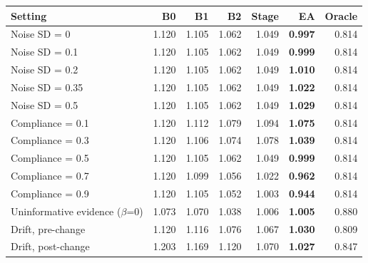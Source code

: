 \begin{tabular}{lrrrrrr}
\toprule
Setting & B0 & B1 & B2 & Stage & \textbf{EA} & Oracle \\
\midrule
Noise SD = 0 & 1.120 & 1.105 & 1.062 & 1.049 & \textbf{0.997} & 0.814 \\
Noise SD = 0.1 & 1.120 & 1.105 & 1.062 & 1.049 & \textbf{0.999} & 0.814 \\
Noise SD = 0.2 & 1.120 & 1.105 & 1.062 & 1.049 & \textbf{1.010} & 0.814 \\
Noise SD = 0.35 & 1.120 & 1.105 & 1.062 & 1.049 & \textbf{1.022} & 0.814 \\
Noise SD = 0.5 & 1.120 & 1.105 & 1.062 & 1.049 & \textbf{1.029} & 0.814 \\
Compliance = 0.1 & 1.120 & 1.112 & 1.079 & 1.094 & \textbf{1.075} & 0.814 \\
Compliance = 0.3 & 1.120 & 1.106 & 1.074 & 1.078 & \textbf{1.039} & 0.814 \\
Compliance = 0.5 & 1.120 & 1.105 & 1.062 & 1.049 & \textbf{0.999} & 0.814 \\
Compliance = 0.7 & 1.120 & 1.099 & 1.056 & 1.022 & \textbf{0.962} & 0.814 \\
Compliance = 0.9 & 1.120 & 1.105 & 1.052 & 1.003 & \textbf{0.944} & 0.814 \\
Uninformative evidence ($\beta$=0) & 1.073 & 1.070 & 1.038 & 1.006 & \textbf{1.005} & 0.880 \\
Drift, pre-change & 1.120 & 1.116 & 1.076 & 1.067 & \textbf{1.030} & 0.809 \\
Drift, post-change & 1.203 & 1.169 & 1.120 & 1.070 & \textbf{1.027} & 0.847 \\
\bottomrule
\end{tabular}